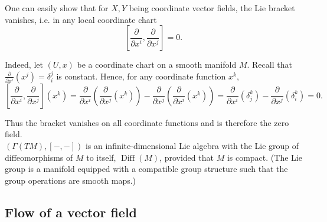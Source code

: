 

One can easily show that for $X,Y$ being coordinate vector fields, the Lie bracket vanishes, i.e. in any local coordinate chart
\begin{equation}
    \label{eq:coordinate_fields_commute}
    \left[\frac{\partial}{\partial x^i}, \frac{\partial}{\partial x^j}\right] = 0.
\end{equation}

Indeed, let $(U,x)$ be a coordinate chart on a smooth manifold $M$. Recall that $\frac{\partial}{\partial x^i}(x^j) = \delta_i^j$ is constant. Hence, for any coordinate function $x^k$,
\[
\left[\frac{\partial}{\partial x^i}, \frac{\partial}{\partial x^j}\right](x^k)
=
\frac{\partial}{\partial x^i}\!\left(\frac{\partial}{\partial x^j}(x^k)\right)
-
\frac{\partial}{\partial x^j}\!\left(\frac{\partial}{\partial x^i}(x^k)\right)
=
\frac{\partial}{\partial x^i}(\delta_j^k)
-
\frac{\partial}{\partial x^j}(\delta_i^k)
=0.
\]

Thus the bracket vanishes on all coordinate functions and is therefore the zero field.\\

$(\Gamma(TM), [-,-])$ is an infinite-dimensional Lie algebra with the Lie group of diffeomorphisms of $M$ to itself, $\operatorname{Diff}(M)$, provided that $M$ is compact. (The Lie group is a manifold equipped with a compatible group structure such that the group operations are smooth maps.)



\subsection{Flow of a vector field}


